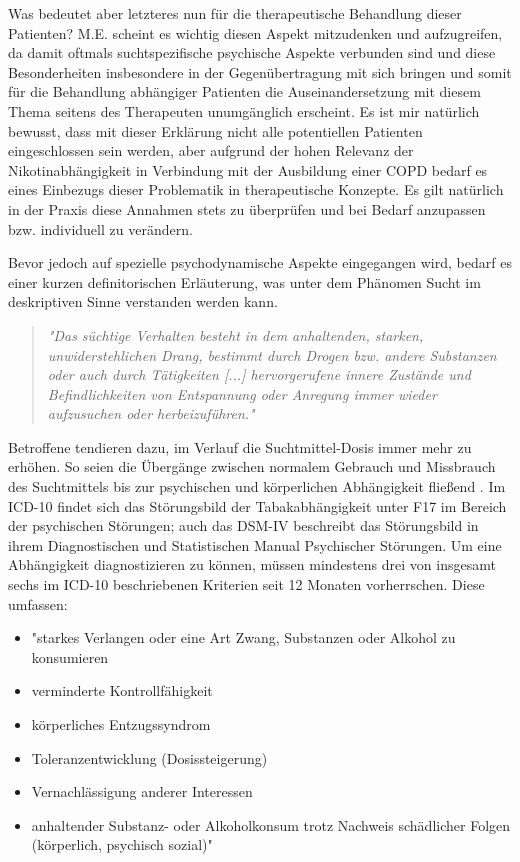 Was bedeutet aber letzteres nun für die therapeutische Behandlung dieser Patienten? M.E. scheint es wichtig diesen Aspekt mitzudenken und aufzugreifen, da damit oftmals  suchtspezifische psychische Aspekte verbunden sind und diese Besonderheiten insbesondere in der Gegenübertragung mit sich bringen und somit für die Behandlung abhängiger Patienten die Auseinandersetzung mit diesem Thema seitens des Therapeuten unumgänglich erscheint. Es ist mir natürlich bewusst, dass mit dieser Erklärung nicht alle potentiellen Patienten eingeschlossen sein werden, aber aufgrund der hohen Relevanz der Nikotinabhängigkeit in Verbindung mit der Ausbildung einer COPD bedarf es eines Einbezugs dieser Problematik in therapeutische Konzepte. Es gilt natürlich in der Praxis diese Annahmen stets zu überprüfen und bei Bedarf anzupassen bzw. individuell zu verändern. 

Bevor jedoch auf spezielle psychodynamische Aspekte eingegangen wird, bedarf es einer kurzen definitorischen Erläuterung, was unter dem Phänomen Sucht im deskriptiven Sinne verstanden werden kann. 
\begin{quote}
\emph{"Das süchtige Verhalten besteht in dem anhaltenden, starken, unwiderstehlichen Drang, bestimmt durch Drogen bzw. andere Substanzen oder auch durch Tätigkeiten [...] hervorgerufene innere Zustände und Befindlichkeiten von Entspannung oder Anregung immer wieder aufzusuchen oder herbeizuführen."} \autocite[173]{mentzos2011} 
\end{quote}
Betroffene tendieren dazu, im Verlauf die Suchtmittel-Dosis immer mehr zu erhöhen. So seien die Übergänge zwischen normalem Gebrauch und Missbrauch des Suchtmittels bis zur psychischen und körperlichen Abhängigkeit fließend \autocite[vgl.][173]{mentzos2011}. Im ICD-10 findet sich das Störungsbild der Tabakabhängigkeit unter F17 im Bereich der psychischen Störungen; auch das DSM-IV beschreibt das Störungsbild in ihrem Diagnostischen und Statistischen Manual Psychischer Störungen. Um eine Abhängigkeit diagnostizieren zu können, müssen mindestens drei von insgesamt sechs im ICD-10 beschriebenen Kriterien seit 12 Monaten vorherrschen. Diese umfassen:

\begin{itemize}
\item "starkes Verlangen oder eine Art Zwang, Substanzen oder Alkohol zu konsumieren
\item verminderte Kontrollfähigkeit
\item körperliches Entzugssyndrom
\item Toleranzentwicklung (Dosissteigerung)
\item Vernachlässigung anderer Interessen
\item anhaltender Substanz- oder Alkoholkonsum trotz Nachweis schädlicher Folgen (körperlich, psychisch sozial)" \autocite[315]{moeller2009}
\end{itemize}


